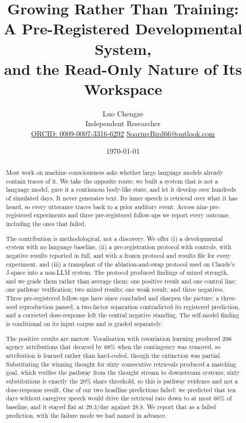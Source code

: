 \documentclass[11pt]{article}
\title{\bfseries Growing Rather Than Training:\\ A Pre-Registered Developmental System,\\ and the Read-Only Nature of Its Workspace}
\author{Luo Chengze\\[3pt]
  {\small Independent Researcher}\\[3pt]
  {\small\href{https://orcid.org/0009-0007-3316-6292}{ORCID: 0009-0007-3316-6292}%
   \quad\textbar\quad
   \href{mailto:SoaringBird66@outlook.com}{SoaringBird66@outlook.com}}}%
\date{\today}
\begin{document}
\maketitle

\begin{abstract}
\noindent
Most work on machine consciousness asks whether large language models already contain traces of it. We take the opposite route: we built a system that is not a language model, gave it a continuous body-like state, and let it develop over hundreds of simulated days. It never generates text. Its inner speech is retrieval over what it has heard, so every utterance traces back to a prior auditory event. Across nine pre-registered experiments and three pre-registered follow-ups we report every outcome, including the ones that failed.

The contribution is methodological, not a discovery. We offer (i) a developmental system with no language baseline, (ii) a pre-registration protocol with controls, with negative results reported in full, and with a frozen protocol and results file for every experiment, and (iii) a transplant of the ablation-and-swap protocol used on Claude's J-space into a non-LLM system. The protocol produced findings of mixed strength, and we grade them rather than average them: one positive result and one control line; one pathway verification; two mixed results; one weak result; and three negatives. Three pre-registered follow-ups have since concluded and sharpen the picture: a three-seed reproduction passed, a two-factor separation contradicted its registered prediction, and a corrected dose-response left the central negative standing. The self-model finding is conditional on its input corpus and is graded separately.

The positive results are narrow. Vocalisation with covariation learning produced 206 agency attributions that decayed by 68\% when the contingency was removed, so attribution is learned rather than hard-coded, though the extinction was partial. Substituting the winning thought for sixty consecutive retrievals produced a matching goal, which verifies the pathway from the thought stream to downstream systems; sixty substitutions is exactly the $20\%$ share threshold, so this is pathway evidence and not a dose-response result. One of our two headline predictions failed: we predicted that ten days without caregiver speech would drive the retrieval rate down to at most $60\%$ of baseline, and it stayed flat at $29.3$/day against $28.8$. We report that as a failed prediction, with the failure mode we had named in advance.


\end{abstract}
\end{document}
